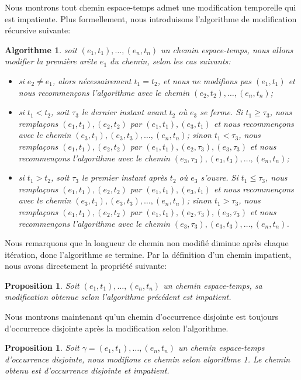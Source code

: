 \documentclass[titlepage,a4paper,12pt]{article}
\newcounter{d}
\newcounter{t}
\newcounter{p}
\newcounter{c}
\newcounter{a}
\newcounter{l}
\newtheorem{prop}[p]{Proposition}
\newtheorem{algo}[a]{Algorithme}
\begin{document}
Nous montrons tout chemin espace-temps admet une modification temporelle qui est impatiente. Plus formellement, nous introduisons l'algorithme de modification récursive suivante:
\begin{algo} soit $(e_1,t_1),\dots,(e_n,t_n)$ un chemin espace-temps, nous allons modifier la première arête $e_1$ du chemin, selon les cas suivants:
\begin{itemize}[label = $\bullet$, leftmargin = *]
\item si $e_2 \neq e_1$, alors nécessairement $t_1 = t_2$, et nous ne modifions pas $(e_1,t_1)$ et nous recommençons l'algorithme avec le chemin $(e_2,t_2),\dots,(e_n,t_n)$;
\item  si $t_1< t_2$, soit $\tau_3$ le dernier instant avant $t_2$ où $e_{3}$ se ferme. Si $t_1 \geqslant \tau_3$, nous remplaçons $(e_1,t_1),(e_2,t_2)$ par $(e_1,t_1),(e_3,t_1)$ et nous recommençons avec le chemin $(e_3,t_1),(e_3,t_3),\dots, (e_n,t_n)$; sinon $t_1 < \tau_3$, nous remplaçons $(e_1,t_1),(e_2,t_2)$ par $(e_1,t_1),(e_2,\tau_3),(e_3,\tau_3)$ et nous recommençons l'algorithme avec le chemin $(e_3,\tau_3),(e_3,t_3),\dots,(e_n,t_n)$;
\item si $t_1 > t_2$, soit $\tau_3$ le premier instant après $t_2$ où $e_{3}$ s'ouvre. Si $t_1 \leqslant \tau_3$, nous remplaçons $(e_1,t_1),(e_2,t_2)$ par $(e_1,t_1),(e_3,t_1)$ et nous recommençons avec le chemin $(e_3,t_1),(e_3,t_3),\dots, (e_n,t_n)$; sinon $t_1 > \tau_3$, nous remplaçons $(e_1,t_1),(e_2,t_2)$ par $(e_1,t_1),(e_2,\tau_3),(e_3,\tau_3)$ et nous recommençons l'algorithme avec le chemin $(e_3,\tau_3),(e_3,t_3),\dots,(e_n,t_n)$.
\end{itemize}
\end{algo}
Nous remarquons que la longueur de chemin non modifié diminue après chaque itération, donc l'algorithme se termine. Par la définition d'un chemin impatient, nous avons directement la propriété suivante:
\begin{prop}
Soit $(e_1,t_1),\dots,(e_n,t_n)$ un chemin espace-temps, sa modification obtenue selon l'algorithme précédent est impatient.
\end{prop}
Nous montrons maintenant qu'un chemin d'occurrence disjointe est toujours d'occurrence disjointe après la modification selon l'algorithme.
\begin{prop} Soit $\gamma = (e_1,t_1),\dots,(e_n,t_n)$ un chemin espace-temps d'occurrence disjointe, nous modifions ce chemin selon algorithme 1. Le chemin obtenu est d'occurrence disjointe et impatient.
\end{prop}
\end{document}
